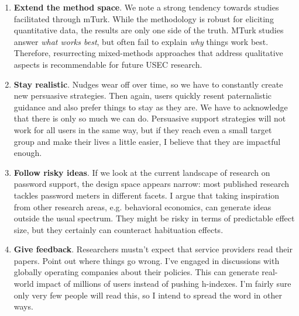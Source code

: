 \begin{enumerate}
	\item \textbf{Extend the method space}. \label{recommendation:method_space}We note a strong tendency towards studies facilitated through \gls{mTurk}. While the methodology is robust for eliciting quantitative data, the results are only one side of the truth. MTurk studies answer \textit{what works best}, but often fail to explain \textit{why} things work best. Therefore, resurrecting mixed-methods approaches that address qualitative aspects is recommendable for future USEC research. 
	
	\item \textbf{Stay realistic}. Nudges wear off over time, so we have to constantly create new persuasive strategies. Then again, users quickly resent paternalistic guidance and also prefer things to stay as they are. We have to acknowledge that there is only so much we can do. Persuasive support strategies will not work for all users in the same way, but if they reach even a small target group and make their lives a little easier, I believe that they are impactful enough. %
	
	\item \textbf{Follow risky ideas}. If we look at the current landscape of research on password support, the design space appears narrow: most published research tackles password meters in different facets. I argue that taking inspiration from other research areas, e.g. behavioral economics, can generate ideas outside the usual spectrum. They might be risky in terms of predictable effect size, but they certainly can counteract habituation effects. 
	
	
	\item \textbf{Give feedback}. Researchers mustn't expect that service providers read their papers. Point out where things go wrong. I've engaged in discussions with globally operating companies about their policies. This can generate real-world impact of millions of users instead of pushing h-indexes. I'm fairly sure only very few people will read this, so I intend to spread the word in other ways.
	
\end{enumerate}

